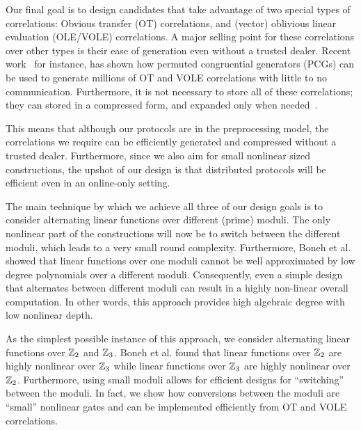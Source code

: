 \begin{itemize}[itemsep=1ex]
    \hspace*{1em} Our final goal is to design candidates that take advantage of two special types of correlations: Obvious transfer (OT) correlations, and (vector) oblivious linear evaluation (OLE/VOLE) correlations. A major selling point for these correlations over other types is their ease of generation even without a trusted dealer. Recent work~\cite{?} for instance, has shown how permuted congruential generators (PCGs) can be used to generate millions of OT and VOLE correlations with little to no communication. Furthermore, it is not necessary to store all of these correlations; they can stored in a compressed form, and expanded only when needed~\cite{?}.

    \hspace*{1em} This means that although our protocols are in the preprocessing model, the correlations we require can be efficiently generated and compressed without a trusted dealer. Furthermore, since we also aim for small nonlinear sized constructions, the upshot of our design is that distributed protocols will be efficient even in an online-only setting. 
\end{itemize}

The main technique by which we achieve all three of our design goals is to consider alternating linear functions over different (prime) moduli. The only nonlinear part of the constructions will now be to switch between the different moduli, which leads to a very small round complexity. Furthermore, Boneh et al.~\cite{boneh2018-darkmatter} showed that linear functions over one moduli cannot be well approximated by low degree polynomials over a different moduli. Consequently, even a simple design that alternates between different moduli can result in a highly non-linear overall computation. In other words, this approach provides high algebraic degree with low nonlinear depth. 

As the simplest possible instance of this approach, we consider alternating linear functions over $\mathbb{Z}_2$ and $\mathbb{Z}_3$. Boneh et al. found that linear functions over $\mathbb{Z}_2$ are highly nonlinear over $\mathbb{Z}_3$ while linear functions over $\mathbb{Z}_3$ are highly nonlinear over $\mathbb{Z}_2$. Furthermore, using small moduli allows for efficient designs for ``switching'' between the moduli. In fact, we show how conversions between the moduli are “small” nonlinear gates and can be implemented efficiently from OT and VOLE correlations.


